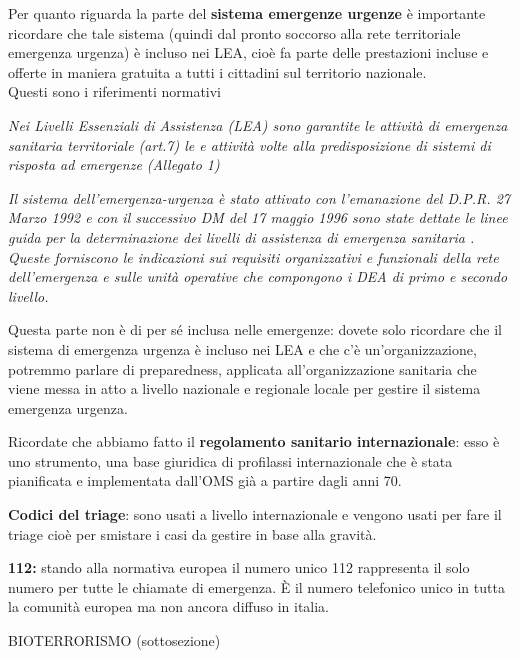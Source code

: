\documentclass[]{article}
\begin{document}
Per quanto riguarda la parte del \textbf{sistema emergenze urgenze} è
importante ricordare che tale sistema (quindi dal pronto soccorso alla
rete territoriale emergenza urgenza) è incluso nei LEA, cioè fa parte
delle prestazioni incluse e offerte in maniera gratuita a tutti i
cittadini sul territorio nazionale.\\
Questi sono i riferimenti normativi

\emph{Nei Livelli Essenziali di Assistenza (LEA) sono garantite le
attività di emergenza sanitaria territoriale (art.7) le e attività volte
alla predisposizione di sistemi di risposta ad emergenze (Allegato 1)}

\emph{Il sistema dell'emergenza-urgenza è stato attivato con
l'emanazione del D.P.R. 27 Marzo 1992 e con il successivo DM del 17
maggio 1996 sono state dettate le linee guida per la determinazione dei
livelli di assistenza di emergenza sanitaria . Queste forniscono le
indicazioni sui requisiti organizzativi e funzionali della rete
dell'emergenza e sulle unità operative che compongono i DEA di primo e
secondo livello.}

Questa parte non è di per sé inclusa nelle emergenze: dovete solo
ricordare che il sistema di emergenza urgenza è incluso nei LEA e che
c'è un'organizzazione, potremmo parlare di preparedness, applicata
all'organizzazione sanitaria che viene messa in atto a livello nazionale
e regionale locale per gestire il sistema emergenza urgenza.

Ricordate che abbiamo fatto il \textbf{regolamento sanitario
internazionale}: esso è uno strumento, una base giuridica di profilassi
internazionale che è stata pianificata e implementata dall'OMS già a
partire dagli anni 70.

\textbf{Codici del triage}: sono usati a livello internazionale e
vengono usati per fare il triage cioè per smistare i casi da gestire in
base alla gravità.

\textbf{112:} stando alla normativa europea il numero unico 112
rappresenta il solo numero per tutte le chiamate di emergenza. È il
numero telefonico unico in tutta la comunità europea ma non ancora
diffuso in italia.

BIOTERRORISMO (sottosezione)
\end{document}
